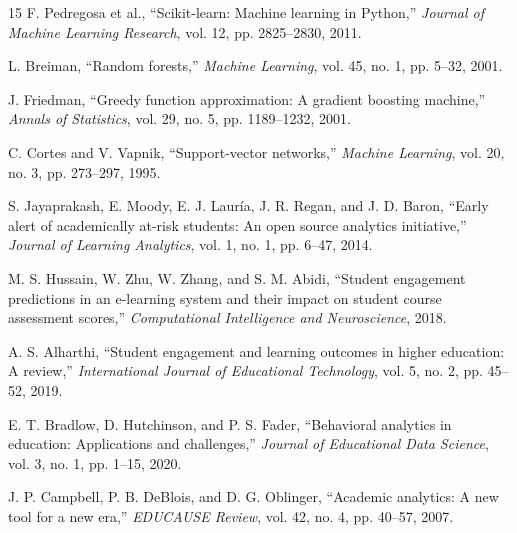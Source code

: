 \documentclass{VITSCOPEThesis}
\begin{document}
\begin{thebibliography}{15}
F. Pedregosa et al., “Scikit-learn: Machine learning in Python,” \textit{Journal of Machine Learning Research}, vol. 12, pp. 2825–2830, 2011.

L. Breiman, “Random forests,” \textit{Machine Learning}, vol. 45, no. 1, pp. 5–32, 2001.

J. Friedman, “Greedy function approximation: A gradient boosting machine,” \textit{Annals of Statistics}, vol. 29, no. 5, pp. 1189–1232, 2001.

C. Cortes and V. Vapnik, “Support-vector networks,” \textit{Machine Learning}, vol. 20, no. 3, pp. 273–297, 1995.

S. Jayaprakash, E. Moody, E. J. Lauría, J. R. Regan, and J. D. Baron, “Early alert of academically at-risk students: An open source analytics initiative,” \textit{Journal of Learning Analytics}, vol. 1, no. 1, pp. 6–47, 2014.

M. S. Hussain, W. Zhu, W. Zhang, and S. M. Abidi, “Student engagement predictions in an e-learning system and their impact on student course assessment scores,” \textit{Computational Intelligence and Neuroscience}, 2018.

A. S. Alharthi, “Student engagement and learning outcomes in higher education: A review,” \textit{International Journal of Educational Technology}, vol. 5, no. 2, pp. 45–52, 2019.

E. T. Bradlow, D. Hutchinson, and P. S. Fader, “Behavioral analytics in education: Applications and challenges,” \textit{Journal of Educational Data Science}, vol. 3, no. 1, pp. 1–15, 2020.

J. P. Campbell, P. B. DeBlois, and D. G. Oblinger, “Academic analytics: A new tool for a new era,” \textit{EDUCAUSE Review}, vol. 42, no. 4, pp. 40–57, 2007.

\end{thebibliography} 
	\newpage
	\newpage
	
\end{document}
